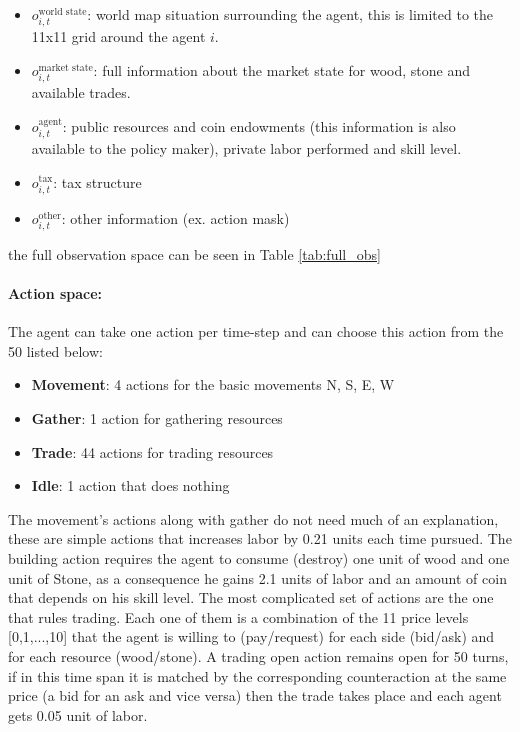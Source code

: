 \begin{itemize}
    \item \(o_{i,t}^{\text{world state}}\): world map situation surrounding the agent, this is limited to the 11x11 grid around the agent \( i \).
    \item \(o_{i,t}^{\text{market state}}\): full information about the market state for wood, stone and available trades.
    \item \(o_{i,t}^{\text{agent}}\): public resources and coin endowments (this information is also available to the policy maker), private labor performed and skill level.
    \item \( o_{i,t}^{\text{tax}} \): tax structure
    \item \( o_{i,t}^{\text{other}} \): other information (ex. action mask)
\end{itemize}
 
the full observation space can be seen in Table \ref{tab:full_obs}

\paragraph{Action space:} The agent can take one action per time-step and can choose this action from the 50 listed below:

\begin{itemize}
    \item \textbf{Movement}: 4 actions for the basic movements N, S, E, W
    \item \textbf{Gather}: 1 action for gathering resources
    \item \textbf{Trade}: 44 actions for trading resources
    \item \textbf{Idle}: 1 action that does nothing
\end{itemize}

The movement's actions along with gather do not need much of an explanation, these are simple actions that increases labor by 0.21 units each time pursued. The building action requires the agent to consume (destroy) one unit of wood and one unit of Stone, as a consequence he gains 2.1 units of labor and an amount of coin that depends on his skill level. The most complicated set of actions are the one that rules trading. Each one of them is a combination of the 11 price levels [0,1,...,10] that the agent is willing to (pay/request) for each side (bid/ask) and for each resource (wood/stone). A trading open action remains open for 50 turns, if in this time span it is matched by the corresponding counteraction at the same price (a bid for an ask and vice versa) then the trade takes place and each agent gets 0.05 unit of labor.


